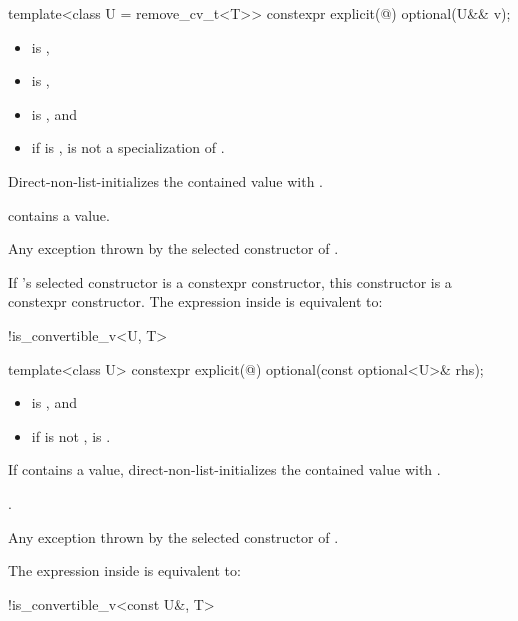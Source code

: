 %
\begin{itemdecl}
template<class U = remove_cv_t<T>> constexpr explicit(@\seebelow@) optional(U&& v);
\end{itemdecl}

\begin{itemdescr}
\pnum
\constraints
\begin{itemize}
\item {} is ,
\item {} is ,
\item {} is , and
\item if  is \cv{} ,
 is not a specialization of .
\end{itemize}

\pnum
\effects
Direct-non-list-initializes the contained value with .

\pnum
\ensures
{} contains a value.

\pnum
\throws
Any exception thrown by the selected constructor of .

\pnum
\remarks
If 's selected constructor is a constexpr constructor,
this constructor is a constexpr constructor.
The expression inside  is equivalent to:
\begin{codeblock}
!is_convertible_v<U, T>
\end{codeblock}
\end{itemdescr}

%
\begin{itemdecl}
template<class U> constexpr explicit(@\seebelow@) optional(const optional<U>& rhs);
\end{itemdecl}

\begin{itemdescr}
\pnum
\constraints
\begin{itemize}
\item {} is , and
\item if  is not \cv{} ,
 is .
\end{itemize}

\pnum
\effects
If  contains a value, direct-non-list-initializes the contained value with .

\pnum
\ensures
{}.

\pnum
\throws
Any exception thrown by the selected constructor of .

\pnum
\remarks
The expression inside  is equivalent to:
\begin{codeblock}
!is_convertible_v<const U&, T>
\end{codeblock}
\end{itemdescr}

